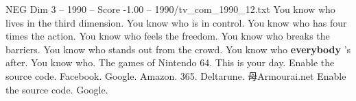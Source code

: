\begin{textsample}{NEG Dim 3 – 1990 – Score -1.00 – 1990/tv\_com\_1990\_12.txt}  \label{ex:f3_neg_025}
You know who lives in the third dimension.
You know who is in control.
You know who has four times the action.
You know who feels the freedom.
You know who breaks the barriers.
You know who stands out from the crowd.
You know who \textbf{everybody} 's after.
You know who.
The games of Nintendo 64.
This is your day.
Enable the source code.
Facebook.
Google.
Amazon. 365.
Deltarune. 母Armourai.net Enable the source code.
Google.

\end{textsample}
